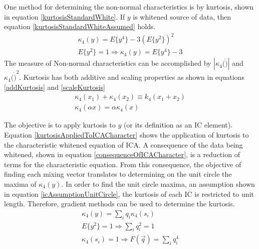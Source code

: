 \documentclass[12pt ]{article}
\begin{document}
One method for determining the non-normal characteristics is by kurtosis, shown in equation \ref{kurtosisStandardWhite}.  If $y$ is whitened source of data, then equation \ref{kurtosisStandardWhiteAssumed} holds.
\begin{eqnarray}
\kappa _4 (y) = E \{ y^4 \} - 3 (E\{ y^2\})^2 \label{kurtosisStandardWhite}\\
E\{ y^2\} =1 \Rightarrow \kappa _4 (y) = E \{ y^4 \} - 3 \label{kurtosisStandardWhiteAssumed}%
\end{eqnarray}
The measure of Non-normal characteristics can be accomplished by $|\kappa_4(\dot)|$ and $\kappa_4 (\dot) ^2$.  %
Kurtosis has both additive and scaling properties as shown in equations \ref{addKurtosis} and \ref{scaleKurtosis}
\begin{eqnarray}
\kappa_4(x_1) + \kappa_4(x_2) \equiv k_4(x_1 + x_2) \label{addKurtosis}\\
\kappa_4(\alpha x) = \alpha \kappa_4 (x) \label{scaleKurtosis}
\end{eqnarray}

The objective is to apply kurtosis to $y$ (or its definition as an IC element).  Equation \ref{kurtosisAppliedToICACharacter} shows the application of kurtosis to the characteristic whitened equation of ICA.  A consequence of the data being whitened, shown in equation \ref{consequenceOfICACharacter}, is a reduction of terms for the characteristic equation.   From this consequence, the objective of finding each mixing vector translates to determining on the unit circle the maxima of $\kappa_4 (y)$.  In order to find the unit circle maxima, an assumption shown in equation \ref{icAssumptionUnitCircle}, the kurtosis of each IC is restricted to unit length.  
Therefore, gradient methods can be used to determine the kurtosis.
\begin{eqnarray}
\kappa_4(y) = \sum _i q_i \kappa_4 (s_i) \label{kurtosisAppliedToICACharacter}\\ 
E\{y^2 \} =1 \Rightarrow \sum_i q_i ^2 =1 \label{consequenceOfICACharacter} \\
\kappa_4(s_i) = 1 \Rightarrow F(\vec{q}) = \sum_i q_i ^4 \label{icAssumptionUnitCircle}
\end{eqnarray}
\end{document}

